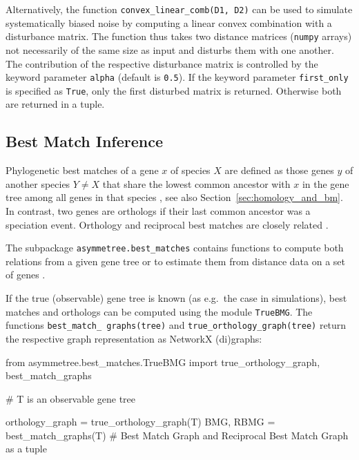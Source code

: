 \documentclass[hidelinks,11pt]{scrreprt}
\begin{document}
Alternatively, the function \texttt{convex\_linear\_comb(D1, D2)} can be used to simulate systematically biased noise by computing a linear convex combination with a disturbance matrix.
The function thus takes two distance matrices (\texttt{numpy} arrays) not necessarily of the same size as input and disturbs them with one another.
The contribution of the respective disturbance matrix is controlled by the keyword parameter \texttt{alpha} (default is \texttt{0.5}).
If the keyword parameter \texttt{first\_only} is specified as \texttt{True}, only the first disturbed matrix is returned.
Otherwise both are returned in a tuple.


\subsection{Best Match Inference}

Phylogenetic best matches of a gene $x$ of species $X$ are defined as those genes $y$ of another species $Y\ne X$ that share the lowest common ancestor with $x$ in the gene tree among all genes in that species \citep{geiss2019a,geiss2020b,geiss2020c}, see also Section~\ref{sec:homology_and_bm}.
In contrast, two genes are orthologs if their last common ancestor was a speciation event.
Orthology and reciprocal best matches are closely related \citep{geiss2020c}.

The subpackage \texttt{asymmetree.best\_matches} contains functions to compute both relations from a given gene tree or to estimate them from distance data on a set of genes \citep{stadler2020}.

If the true (observable) gene tree is known (as e.g.\ the case in simulations), best matches and orthologs can be computed using the module \texttt{TrueBMG}.
The functions \texttt{best\_match\_ graphs(tree)} and \texttt{true\_orthology\_graph(tree)} return the respective graph representation as NetworkX (di)graphs:

\vspace{2mm}
\begin{python}
from asymmetree.best_matches.TrueBMG import true_orthology_graph, best_match_graphs

# T is an observable gene tree

orthology_graph = true_orthology_graph(T)
BMG, RBMG = best_match_graphs(T)    # Best Match Graph and Reciprocal Best Match Graph as a tuple
\end{python}
\vspace{2mm}
\end{document}
